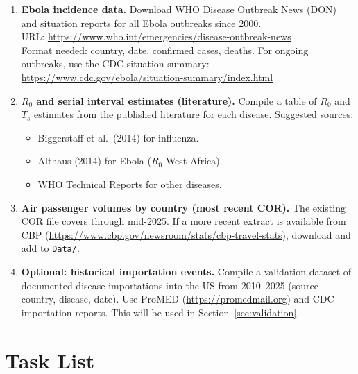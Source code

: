 \documentclass[12pt]{article}
\begin{document}
\begin{enumerate}
  \item[$\star$] \textbf{Ebola incidence data.}
        Download WHO Disease Outbreak News (DON) and situation
        reports for all Ebola outbreaks since 2000.\\
        URL: \url{https://www.who.int/emergencies/disease-outbreak-news}\\
        Format needed: country, date, confirmed cases, deaths.
        For ongoing outbreaks, use the CDC situation summary:\\
        \url{https://www.cdc.gov/ebola/situation-summary/index.html}

  \item[$\star$] \textbf{$R_0$ and serial interval estimates (literature).}
        Compile a table of $R_0$ and $T_s$ estimates from the
        published literature for each disease. Suggested sources:
        \begin{itemize}
          \item Biggerstaff et al.\ (2014) for influenza.
          \item Althaus (2014) for Ebola ($R_0$ West Africa).
          \item WHO Technical Reports for other diseases.
        \end{itemize}

  \item[$\star$] \textbf{Air passenger volumes by country (most recent COR).}
        The existing COR file covers through mid-2025. If a more
        recent extract is available from CBP
        (\url{https://www.cbp.gov/newsroom/stats/cbp-travel-stats}),
        download and add to \texttt{Data/}.

  \item[$\star$] \textbf{Optional: historical importation events.}
        Compile a validation dataset of documented disease
        importations into the US from 2010--2025 (source country,
        disease, date). Use ProMED
        (\url{https://promedmail.org}) and CDC importation
        reports. This will be used in Section~\ref{sec:validation}.
\end{enumerate}

\section{Task List}
\end{document}
